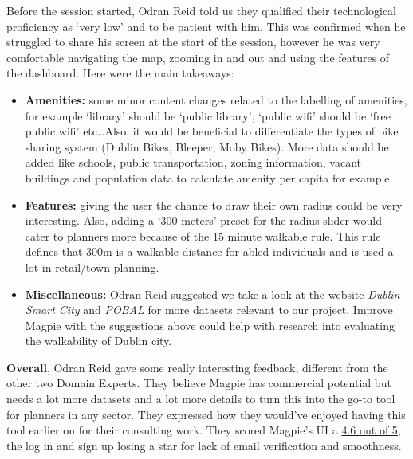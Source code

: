 \noindent Before the session started, Odran Reid told us they qualified their
technological proficiency as `very low' and to be patient with him. This was
confirmed when he struggled to share his screen at the start of the session,
however he was very comfortable navigating the map, zooming in and out and using
the features of the dashboard. Here were the main takeaways:
\begin{itemize}
    \item \textbf{Amenities:} some minor content changes related to the
    labelling of amenities, for example `library' should be `public library',
    `public wifi' should be `free public wifi' etc\ldots Also, it would be
    beneficial to differentiate the types of bike sharing system (Dublin Bikes,
    Bleeper, Moby Bikes). More data should be added like schools, public
    transportation, zoning information, vacant buildings and population data to
    calculate amenity per capita for example.
    \vspace{0.2cm}

    \item \textbf{Features:} giving the user the chance to draw their own radius
    could be very interesting. Also, adding a `300 meters' preset for the radius
    slider would cater to planners more because of the 15 minute walkable
    rule. This rule defines that 300m is a walkable distance for abled
    individuals and is used a lot in retail/town planning.
    \vspace{0.2cm}

    \item \textbf{Miscellaneous:} Odran Reid suggested we take a look at the
    website \emph{Dublin Smart City} and \emph{POBAL} for more datasets relevant
    to our project. Improve Magpie with the suggestions above could help with
    research into evaluating the walkability of Dublin city.
    \vspace{0.2cm}
\end{itemize}
\textbf{Overall}, Odran Reid gave some really interesting feedback, different
from the other two Domain Experts. They believe Magpie has commercial potential
but needs a lot more datasets and a lot more details to turn this into the go-to
tool for planners in any sector. They expressed how they would've enjoyed having
this tool earlier on for their consulting work.
They scored Magpie's UI a \underline{4.6 out of 5}, the log in and sign up
losing a star for lack of email verification and smoothness.
